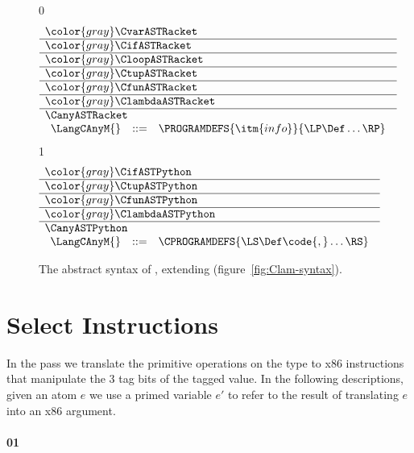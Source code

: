 \documentclass[7x10]{TimesAPriori_MIT}%
\newcommand{\gray}[1]{{\color{gray} #1}}
\def\racketEd{0}
\def\pythonEd{1}
\def\edition{0}
\newcommand{\racket}[1]{{\if\edition\racketEd{#1}\fi}}
\newcommand{\python}[1]{{\if\edition\pythonEd #1\fi}}
\numberwithin{theorem}{chapter}
\numberwithin{definition}{chapter}
\numberwithin{equation}{chapter}
\begin{document}
\begin{figure}[tp]
  \begin{tcolorbox}[colback=white]
\small
{\if\edition\racketEd
\[
\begin{array}{l}
  \gray{\CvarASTRacket} \\ \hline
  \gray{\CifASTRacket} \\ \hline
  \gray{\CloopASTRacket} \\ \hline
  \gray{\CtupASTRacket} \\ \hline
  \gray{\CfunASTRacket} \\ \hline
  \gray{\ClambdaASTRacket} \\ \hline
  \CanyASTRacket \\
\begin{array}{lcl}
\LangCAnyM{} & ::= & \PROGRAMDEFS{\itm{info}}{\LP\Def\ldots\RP}
\end{array}
\end{array}
\]
\fi}
{\if\edition\pythonEd
\[
  \begin{array}{l}
  \gray{\CifASTPython} \\ \hline
  \gray{\CtupASTPython} \\ \hline
  \gray{\CfunASTPython} \\ \hline
  \gray{\ClambdaASTPython} \\ \hline
  \CanyASTPython \\
  \begin{array}{lcl}
    \LangCAnyM{} & ::= & \CPROGRAMDEFS{\LS\Def\code{,}\ldots\RS} 
  \end{array}
  \end{array}
\]
\fi}
  \end{tcolorbox}

\caption{The abstract syntax of \LangCAny{}, extending \LangCLam{} (figure~\ref{fig:Clam-syntax}).}
\label{fig:c5-syntax}
\end{figure}


\section{Select Instructions}
\label{sec:select-Lany}

In the  pass we translate the primitive
operations on the \ANYTY{} type to x86 instructions that manipulate
the 3 tag bits of the tagged value. In the following descriptions,
given an atom $e$ we use a primed variable $e'$ to refer to the result
of translating $e$ into an x86 argument.

\paragraph{\racket{}\python{}}
\end{document}
